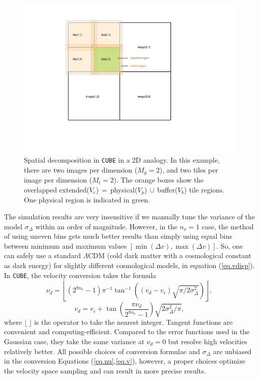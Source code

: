 \documentclass[10pt,twocolumn,reprint]{emulateapj}
\begin{document}
\begin{figure}
\centering
  \includegraphics[width=0.9\linewidth]{f2}
 \caption{Spatial decomposition in {\tt CUBE} in a 2D analogy. In this example, there are two images per dimension ($M_g=2$), and two tiles per image per dimension ($M_t=2$). The orange boxes show the overlapped extended($V_e$)$\,=\,$physical($V_p$)$\,\cup\,$buffer($V_b$) tile regions. One physical region is indicated in green.}
\label{fig.tile}
\end{figure}

The simulation results are very insensitive if we manually tune the variance of the model $\sigma_\Delta$ within an order of magnitude. However, in the $n_\nu=1$ case, the method of using uneven bins gets much better results than simply using equal bins between minimum and maximum values $[\min(\Delta v),\max(\Delta v)]$. So, one can safely use a standard $\Lambda$CDM (cold dark matter with a cosmological constant as dark energy) for slightly different cosmological models, in equation (\ref{eq.vdisp}). In {\tt CUBE}, the velocity conversion takes the formula
\begin{equation}\label{eq.nu}
	\nu_d=\left\lfloor(2^{8n_\nu}-1)\pi^{-1}\tan^{-1}\left((v_d-v_c)\sqrt{\pi/2\sigma_\Delta^2}\right)\right\rfloor,
\end{equation}
\begin{equation}\label{eq.v}
	v_d=v_c+\tan\left(\frac{\pi\nu_d}{2^{8n_\nu}-1}\right)\sqrt{2\sigma_\Delta^2/\pi},
\end{equation}
where $\lfloor\ \rfloor$ is the operator to take the nearest integer. Tangent functions are convenient and computing-efficient. Compared to the error functions used in the Gaussian case, they take the same variance at $\nu_d=0$ but resolve high velocities relatively better.  All possible choices of conversion formulae and $\sigma_\Delta$ are unbiased in the conversion Equations (\ref{eq.nu},\ref{eq.v}), however, a proper choices optimize the velocity space sampling and can result in more precise results.
\end{document}

